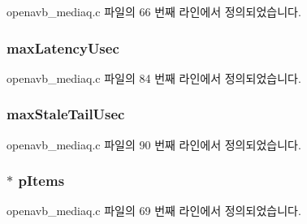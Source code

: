 openavb\+\_\+mediaq.\+c 파일의 66 번째 라인에서 정의되었습니다.

\subsubsection[{\texorpdfstring{max\+Latency\+Usec}{maxLatencyUsec}}]{ max\+Latency\+Usec}\hypertarget{structmedia__q__info__t_acd47d287eb099e2b995adfb4608d34a6}{}\label{structmedia__q__info__t_acd47d287eb099e2b995adfb4608d34a6}


openavb\+\_\+mediaq.\+c 파일의 84 번째 라인에서 정의되었습니다.

\subsubsection[{\texorpdfstring{max\+Stale\+Tail\+Usec}{maxStaleTailUsec}}]{ max\+Stale\+Tail\+Usec}\hypertarget{structmedia__q__info__t_a530245db1a2a9b9874d368ae14faa133}{}\label{structmedia__q__info__t_a530245db1a2a9b9874d368ae14faa133}


openavb\+\_\+mediaq.\+c 파일의 90 번째 라인에서 정의되었습니다.

\subsubsection[{\texorpdfstring{p\+Items}{pItems}}]{$\ast$ p\+Items}\hypertarget{structmedia__q__info__t_adb9655d2d1cff2b1144a0e7ad28eea21}{}\label{structmedia__q__info__t_adb9655d2d1cff2b1144a0e7ad28eea21}


openavb\+\_\+mediaq.\+c 파일의 69 번째 라인에서 정의되었습니다.

